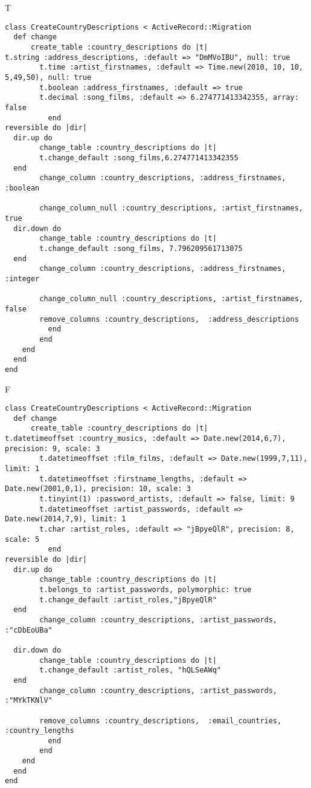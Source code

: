 T
\begin{verbatim}
class CreateCountryDescriptions < ActiveRecord::Migration
  def change
	  create_table :country_descriptions do |t|
t.string :address_descriptions, :default => "DmMVoIBU", null: true
		t.time :artist_firstnames, :default => Time.new(2010, 10, 10, 5,49,50), null: true
		t.boolean :address_firstnames, :default => true
		t.decimal :song_films, :default => 6.274771413342355, array: false
		  end
reversible do |dir|
  dir.up do
		change_table :country_descriptions do |t|
		t.change_default :song_films,6.274771413342355
  end
 		change_column :country_descriptions, :address_firstnames, :boolean
   
		change_column_null :country_descriptions, :artist_firstnames,  true
  dir.down do
		change_table :country_descriptions do |t|
		t.change_default :song_films, 7.796209561713075
  end
 		change_column :country_descriptions, :address_firstnames, :integer
   
		change_column_null :country_descriptions, :artist_firstnames, false
 		remove_columns :country_descriptions,  :address_descriptions 
	      end
	    end
    end 
  end
end

\end{verbatim}

F
\begin{verbatim}
class CreateCountryDescriptions < ActiveRecord::Migration
  def change
	  create_table :country_descriptions do |t|
t.datetimeoffset :country_musics, :default => Date.new(2014,6,7), precision: 9, scale: 3
		t.datetimeoffset :film_films, :default => Date.new(1999,7,11), limit: 1
		t.datetimeoffset :firstname_lengths, :default => Date.new(2001,0,1), precision: 10, scale: 3
		t.tinyint(1) :password_artists, :default => false, limit: 9
		t.datetimeoffset :artist_passwords, :default => Date.new(2014,7,9), limit: 1
		t.char :artist_roles, :default => "jBpyeQlR", precision: 8, scale: 5
		  end
reversible do |dir|
  dir.up do
		change_table :country_descriptions do |t|
		t.belongs_to :artist_passwords, polymorphic: true
 		t.change_default :artist_roles,"jBpyeQlR"
  end
 		change_column :country_descriptions, :artist_passwords, :"cDbEoUBa"
   
  dir.down do
		change_table :country_descriptions do |t|
		t.change_default :artist_roles, "hQLSeAWq"
  end
 		change_column :country_descriptions, :artist_passwords, :"MYkTKNlV"
   
		remove_columns :country_descriptions,  :email_countries, :country_lengths 
	      end
	    end
    end 
  end
end

\end{verbatim}

